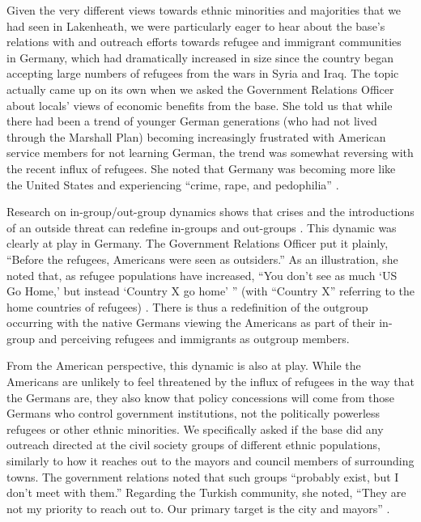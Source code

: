 Given the very different views towards ethnic minorities and majorities that we had seen in Lakenheath, we were particularly eager to hear about the base's relations with and outreach efforts towards refugee and immigrant communities in Germany, which had dramatically increased in size since the country began accepting large numbers of refugees from the wars in Syria and Iraq. The topic actually came up on its own when we asked the Government Relations Officer about locals' views of economic benefits from the base. She told us that while there had been a trend of younger German generations (who had not lived through the Marshall Plan) becoming increasingly frustrated with American service members for not learning German, the trend was somewhat reversing with the recent influx of refugees. She noted that Germany was becoming more like the United States and experiencing ``crime, rape, and pedophilia'' \cite{kaserneone20190725}. 


Research on in-group/out-group dynamics shows that crises and the introductions of an outside threat can redefine in-groups and out-groups \cite{Coser1998,Levy1989,Simmel2010}. This dynamic was clearly at play in Germany. The Government Relations Officer put it plainly, ``Before the refugees, Americans were seen as outsiders.'' As an illustration, she noted that, as refugee populations have increased, ``You don't see as much `US Go Home,' but instead `Country X go home' '' (with ``Country X'' referring to the home countries of refugees) \cite{kaserneone20190725}. There is thus a redefinition of the outgroup occurring with the native Germans viewing the Americans as part of their in-group and perceiving refugees and immigrants as outgroup members.

From the American perspective, this dynamic is also at play. While the Americans are unlikely to feel threatened by the influx of refugees in the way that the Germans are, they also know that policy concessions will come from those Germans who control government institutions, not the politically powerless refugees or other ethnic minorities. We specifically asked if the base did any outreach directed at the civil society groups of different ethnic populations, similarly to how it reaches out to the mayors and council members of surrounding towns. The government relations noted that such groups ``probably exist, but I don't meet with them.'' Regarding the Turkish community, she noted, ``They are not my priority to reach out to. Our primary target is the city and mayors'' \cite{kaserneone20190725}.

